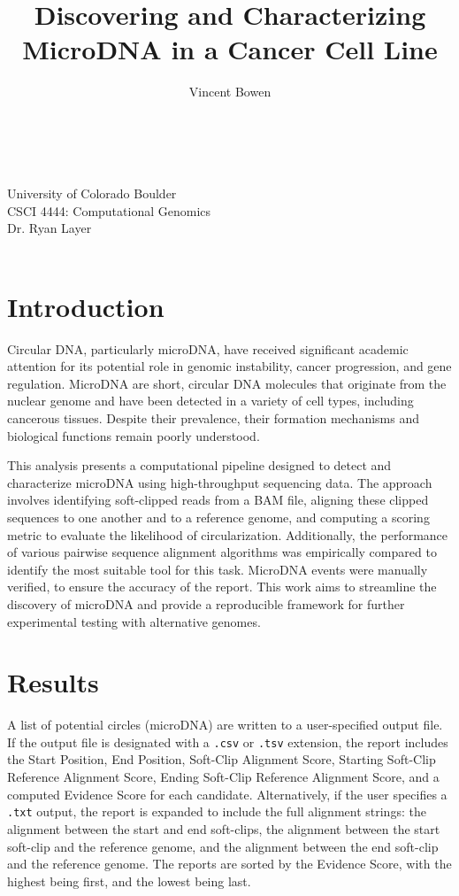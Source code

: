 \documentclass[11pt, letterpaper]{article}
\makeatletter
\newcommand{\university}[1]{\def\@university{#1}}
\newcommand{\prof}[1]{\def\@prof{#1}}
\newcommand{\course}[1]{\def\@course{#1}}
\def\@university{}
\def\@prof{}
\def\@course{}
\renewcommand\maketitle{
{\raggedright
\begin{center}
{\Large \@title }\\[1ex] 
{\@author }\\[1ex]
{\@university }\\[3ex]
{\@course}\\[1ex]
{\@prof }\\[1ex]
\@date\\[8ex]
\end{center}}}
\makeatother
\begin{document}
\title{Discovering and Characterizing MicroDNA in a Cancer Cell Line}
\author{Vincent Bowen}
\university{University of Colorado Boulder}
\course{CSCI 4444: Computational Genomics}
\prof{Dr. Ryan Layer}
\maketitle


\section{Introduction}
Circular DNA, particularly microDNA, have received significant academic attention for its potential role in genomic instability, cancer progression, and gene regulation. MicroDNA are short, circular DNA molecules that originate from the nuclear genome and have been detected in a variety of cell types, including cancerous tissues. Despite their prevalence, their formation mechanisms and biological functions remain poorly understood. 

This analysis presents a computational pipeline designed to detect and characterize microDNA using high-throughput sequencing data. The approach involves identifying soft-clipped reads from a BAM file, aligning these clipped sequences to one another and to a reference genome, and computing a scoring metric to evaluate the likelihood of circularization. Additionally, the performance of various pairwise sequence alignment algorithms was empirically compared to identify the most suitable tool for this task. MicroDNA events were manually verified, to ensure the accuracy of the report. This work aims to streamline the discovery of microDNA and provide a reproducible framework for further experimental testing with alternative genomes.


\section{Results}
A list of potential circles (microDNA) are written to a user-specified output file. If the output file is designated with a \verb|.csv| or \verb|.tsv| extension, the report includes the Start Position, End Position, Soft-Clip Alignment Score, Starting Soft-Clip Reference Alignment Score, Ending Soft-Clip Reference Alignment Score, and a computed Evidence Score for each candidate. Alternatively, if the user specifies a \verb|.txt| output, the report is expanded to include the full alignment strings: the alignment between the start and end soft-clips, the alignment between the start soft-clip and the reference genome, and the alignment between the end soft-clip and the reference genome. The reports are sorted by the Evidence Score, with the highest being first, and the lowest being last. 
\end{document}
